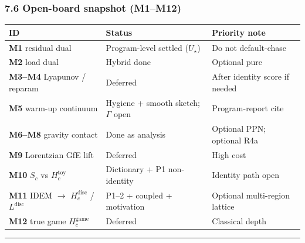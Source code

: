 \documentclass[
  11pt,
]{article}
\newcounter{none} %
\begin{document}
\subsubsection{7.6 Open-board snapshot
(M1--M12)}\label{open-board-snapshot-m1m12}

{\def\LTcaptype{none} %
\begin{longtable}[]{@{}
  >{\raggedright\arraybackslash}p{}
  >{\raggedright\arraybackslash}p{}
  >{\raggedright\arraybackslash}p{}@{}}
\toprule\noalign{}
\begin{minipage}[b]{\linewidth}\raggedright
ID
\end{minipage} & \begin{minipage}[b]{\linewidth}\raggedright
Status
\end{minipage} & \begin{minipage}[b]{\linewidth}\raggedright
Priority note
\end{minipage} \\
\midrule\noalign{}
\endhead
\bottomrule\noalign{}
\endlastfoot
\textbf{M1} residual dual & Program-level settled (\(U_\star\)) & Do not
default-chase \\
\textbf{M2} load dual & Hybrid done & Optional pure \\
\textbf{M3--M4} Lyapunov / reparam & Deferred & After identity score if
needed \\
\textbf{M5} warm-up continuum & Hygiene + smooth sketch; \(\Gamma\) open
& Program-report cite \\
\textbf{M6--M8} gravity contact & Done as analysis & Optional PPN;
optional R4a \\
\textbf{M9} Lorentzian GfE lift & Deferred & High cost \\
\textbf{M10} \(S_c\) vs \(H_c^{\mathrm{toy}}\) & Dictionary + P1
non-identity & Identity path open \\
\textbf{M11} IDEM $\to$ \(H_c^{\mathrm{disc}}\) / \(L^{\mathrm{disc}}\) &
P1--2 + coupled + motivation & Optional multi-region lattice \\
\textbf{M12} true game \(H_c^{\mathrm{game}}\) & Deferred & Classical
depth \\
\end{longtable}
}

\begin{center}\rule{0.5\linewidth}{0.5pt}\end{center}
\end{document}
